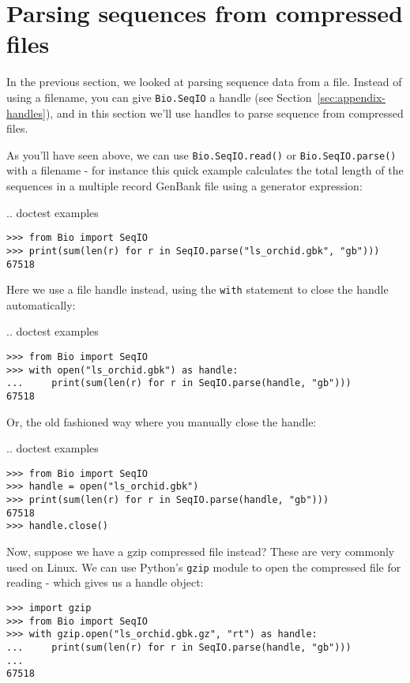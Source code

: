 \section{Parsing sequences from compressed files}
\label{sec:SeqIO_compressed}
In the previous section, we looked at parsing sequence data from a file.
Instead of using a filename, you can give \verb|Bio.SeqIO| a handle
(see Section~\ref{sec:appendix-handles}), and in this section
we'll use handles to parse sequence from compressed files.

As you'll have seen above, we can use \verb|Bio.SeqIO.read()| or
\verb|Bio.SeqIO.parse()| with a filename - for instance this quick
example calculates the total length of the sequences in a multiple
record GenBank file using a generator expression:

\pandocignoreme .. doctest examples
\begin{verbatim}
>>> from Bio import SeqIO
>>> print(sum(len(r) for r in SeqIO.parse("ls_orchid.gbk", "gb")))
67518
\end{verbatim}

\noindent
Here we use a file handle instead, using the \verb|with| statement
to close the handle automatically:

\pandocignoreme .. doctest examples
\begin{verbatim}
>>> from Bio import SeqIO
>>> with open("ls_orchid.gbk") as handle:
...     print(sum(len(r) for r in SeqIO.parse(handle, "gb")))
67518
\end{verbatim}

\noindent
Or, the old fashioned way where you manually close the handle:

\pandocignoreme .. doctest examples
\begin{verbatim}
>>> from Bio import SeqIO
>>> handle = open("ls_orchid.gbk")
>>> print(sum(len(r) for r in SeqIO.parse(handle, "gb")))
67518
>>> handle.close()
\end{verbatim}

Now, suppose we have a gzip compressed file instead? These are very
commonly used on Linux. We can use Python's \verb|gzip| module to open
the compressed file for reading - which gives us a handle object:

\begin{verbatim}
>>> import gzip
>>> from Bio import SeqIO
>>> with gzip.open("ls_orchid.gbk.gz", "rt") as handle:
...     print(sum(len(r) for r in SeqIO.parse(handle, "gb")))
...
67518
\end{verbatim}

